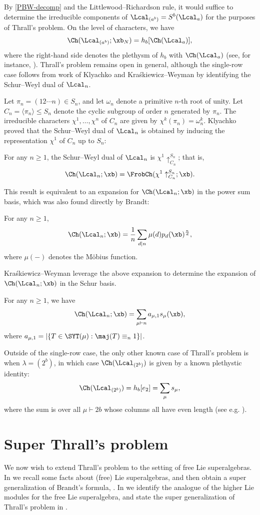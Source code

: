 By \eqref{PBW-decomp} and the Littlewood--Richardson rule, it would suffice to determine the irreducible components of $\Lcal_{(a^b)} = S^b(\Lcal_a)$ for the purposes of Thrall's problem. On the level of characters, we have
\[
\Ch(\Lcal_{(a^b)};\xb_N) = h_b[\Ch(\Lcal_a)],
\]
where the right-hand side denotes the plethysm of $h_b$ with $\Ch(\Lcal_a)$ (see, for instance, \cite[Appendix~2]{Stan}). Thrall's problem remains open in general, although the single-row case follows from work of Klyachko \cite{Kly} and Kra{\'s}kiewicz--Weyman \cite{KW} by identifying the Schur--Weyl dual of $\Lcal_n$.

Let $\pi_n = (12 \cdots n) \in S_n$, and let $\omega_n$ denote a primitive $n$-th root of unity. Let $C_n = \langle \pi_n \rangle \le S_n$ denote the cyclic subgroup of order $n$ generated by $\pi_n$. The irreducible characters $\chi^1, \ldots, \chi^n$ of $C_n$ are given by $\chi^k(\pi_n) = \omega_n^k$. Klyachko proved that the Schur--Weyl dual of $\Lcal_n$ is obtained by inducing the representation $\chi^1$ of $C_n$ up to $S_n$:
\begin{thm}\label{thm:kly}
For any $n \ge 1$, the Schur--Weyl dual of $\Lcal_n$ is $\chi^1 \uparrow_{C_n}^{S_n}$; that is,
\[
\Ch(\Lcal_n;\xb) = \FrobCh(\chi^1 \uparrow_{C_n}^{S_n};\xb).
\]
\end{thm}
This result is equivalent to an expansion for $\Ch(\Lcal_n;\xb)$ in the power sum basis, which was also found directly by Brandt:
\begin{thm}\label{thm:brandt}
For any $n \ge 1$,
\[
\Ch(\Lcal_n;\xb) = \frac{1}{n} \sum_{d \mid n} \mu(d) p_d(\xb)^{\frac{n}{d}},
\]
where $\mu(-)$ denotes the M{\"o}bius function.
\end{thm}
Kra{\'s}kiewicz--Weyman leverage the above expansion to determine the expansion of $\Ch(\Lcal_n;\xb)$ in the Schur basis.
\begin{thm}[\cite{KW}]\label{thm:KW}
For any $n \ge 1$, we have
\[
\Ch(\Lcal_n;\xb) = \sum_{\mu \vdash n} a_{\mu,1} s_\mu(\xb),
\]
where $a_{\mu,1} = |\{ T \in \SYT(\mu) : \maj(T) \equiv_n 1 \}|$.
\end{thm}
Outside of the single-row case, the only other known case of Thrall's problem is when $\lambda = (2^b)$, in which case $\Ch(\Lcal_{(2^b)})$ is given by a known plethystic identity:
\[
\Ch(\Lcal_{(2^b)}) = h_b[e_2] = \sum_{\mu} s_\mu,
\]
where the sum is over all $\mu \vdash 2b$ whose columns all have even length (see e.g. \cite[Ex.~I.8.6(b)]{Mac}).

\section{Super Thrall's problem}\label{sec:Thrall}
We now wish to extend Thrall's problem to the setting of free Lie superalgebras. In  we recall some facts about (free) Lie superalgebras, and then obtain a super generalization of Brandt's formula, . In  we identify the analogue of the higher Lie modules for the free Lie superalgebra, and state the super generalization of Thrall's problem in .

